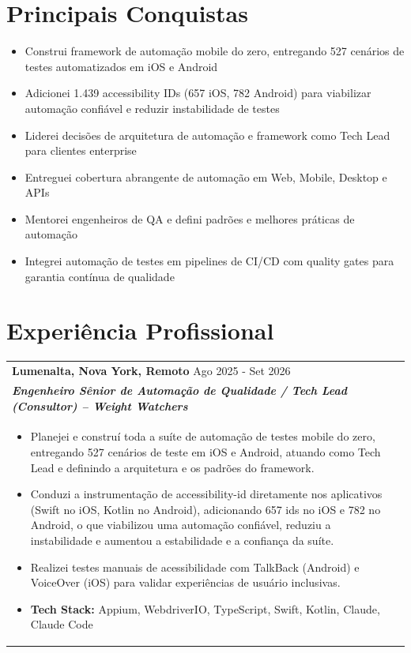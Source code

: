 \documentclass[a4paper,8pt]{article}
\begin{document}
\section{Principais Conquistas}
\begin{itemize}[nosep,after=\strut, leftmargin=2em, itemsep=2pt]
    \item Construi framework de automa\c{c}\~ao mobile do zero, entregando 527 cen\'arios de testes automatizados em iOS e Android
    \item Adicionei 1.439 accessibility IDs (657 iOS, 782 Android) para viabilizar automa\c{c}\~ao confi\'avel e reduzir instabilidade de testes
    \item Liderei decis\~oes de arquitetura de automa\c{c}\~ao e framework como Tech Lead para clientes enterprise
    \item Entreguei cobertura abrangente de automa\c{c}\~ao em Web, Mobile, Desktop e APIs
    \item Mentorei engenheiros de QA e defini padr\~oes e melhores pr\'aticas de automa\c{c}\~ao
    \item Integrei automa\c{c}\~ao de testes em pipelines de CI/CD com quality gates para garantia cont\'inua de qualidade
\end{itemize}

\section{Experi\^encia Profissional}

\begin{tabularx}{\linewidth}{ @{}l r@{} }
\textbf{{Lumenalta, Nova York, Remoto}} \hfill \color[HTML]{371e77} Ago 2025 - Set 2026 \\[4pt]
\color[HTML]{371e77}\textbf{\textit{Engenheiro S\^enior de Automa\c{c}\~ao de Qualidade / Tech Lead (Consultor) -- Weight Watchers}}\ \hfill \color[HTML]{4B28A4} \\[5pt]
\begin{minipage}[t]{\linewidth}
    \begin{itemize}[nosep,after=\strut, leftmargin=2em, itemsep=2pt]
        \item Planejei e constru\'i toda a su\'ite de automa\c{c}\~ao de testes mobile do zero, entregando 527 cen\'arios de teste em iOS e Android, atuando como Tech Lead e definindo a arquitetura e os padr\~oes do framework.
        \item Conduzi a instrumenta\c{c}\~ao de accessibility-id diretamente nos aplicativos (Swift no iOS, Kotlin no Android), adicionando 657 ids no iOS e 782 no Android, o que viabilizou uma automa\c{c}\~ao confi\'avel, reduziu a instabilidade e aumentou a estabilidade e a confian\c{c}a da su\'ite.
        \item Realizei testes manuais de acessibilidade com TalkBack (Android) e VoiceOver (iOS) para validar experi\^encias de usu\'ario inclusivas.
        \item \textbf{Tech Stack:} Appium, WebdriverIO, TypeScript, Swift, Kotlin, Claude, Claude Code
    \end{itemize}
\end{minipage}
\end{tabularx}
\end{document}
